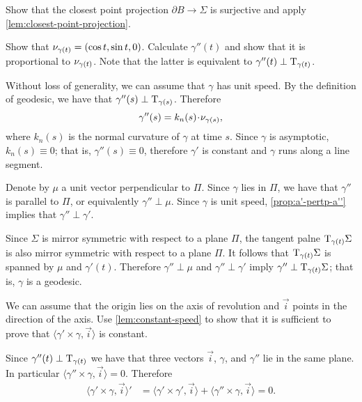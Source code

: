 Show that the closest point projection $\partial B \to \Sigma $ is surjective and apply \ref{lem:closest-point-projection}.

\setcounter{eqtn}{0}

Show that $\nu_{\gamma(t)}=(\cos t,\sin t, 0)$.
Calculate $\gamma''(t)$ and show that it is proportional to $\nu_{\gamma(t)}$.
Note that the latter is equivalent to $\gamma''(t)\perp\mathrm{T}_{\gamma(t)}$.

 Without loss of generality, we can assume that $\gamma$ has unit speed.
By the definition of geodesic, we have that $\gamma''(s)\perp\mathrm{T}_{\gamma(s)}$. 
Therefore 
\[\gamma''(s)=k_n(s)\cdot\Norm_{\gamma(s)},\]
where $k_n(s)$ is the normal curvature of $\gamma$ at time $s$.
Since $\gamma$ is asymptotic, $k_n(s)\equiv 0$;
that is, $\gamma''(s)\equiv 0$, therefore $\gamma'$ is constant and $\gamma$ runs along a line segment.

Denote by $\mu$ a unit vector perpendicular to $\Pi$.
Since $\gamma$ lies in $\Pi$, we have that $\gamma''$ is parallel to $\Pi$, or equivalently $\gamma''\perp \mu$.
Since $\gamma$ is unit speed, \ref{prop:a'-pertp-a''} implies that $\gamma''\perp\gamma'$.

Since $\Sigma$ is mirror symmetric with respect to  a plane $\Pi$,
the tangent palne $\mathrm{T}_{\gamma(t)}\Sigma$ is also mirror symmetric with respect to  a plane $\Pi$.
It follows that $\mathrm{T}_{\gamma(t)}\Sigma$ is spanned by $\mu$ and $\gamma'(t)$.
Therefore $\gamma''\perp \mu$ and $\gamma''\perp\gamma'$ imply $\gamma''\perp\mathrm{T}_{\gamma(t)}\Sigma$;
that is, $\gamma$ is a geodesic.

We can assume that the origin lies on the axis of revolution and $\vec i$ points in the direction of the axis.
Use \ref{lem:constant-speed} to show that it is sufficient to prove that 
$\langle\gamma'\times \gamma,\vec i\rangle$
is constant.

Since $\gamma''(t)\perp\mathrm{T}_{\gamma(t)}$ we have that three vectors $\vec i$, $\gamma$, and $\gamma''$ lie in the same plane.
In particular $\langle\gamma''\times \gamma,\vec i\rangle=0$.
Therefore
\begin{align*}
\langle\gamma'\times \gamma,\vec i\rangle'
&=
\langle\gamma'\times \gamma',\vec i\rangle+\langle\gamma''\times \gamma,\vec i\rangle =0.
\end{align*}



